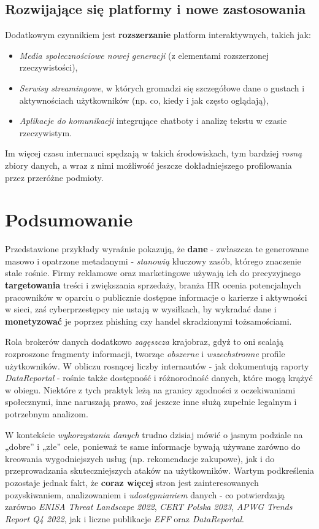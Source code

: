 \subsection{Rozwijające się platformy i nowe zastosowania}
Dodatkowym czynnikiem jest \textbf{rozszerzanie} platform interaktywnych, takich jak:
\begin{itemize}
    \item \emph{Media społecznościowe nowej generacji} (z elementami rozszerzonej rzeczywistości),
    \item \emph{Serwisy streamingowe}, w których gromadzi się szczegółowe dane o gustach i aktywnościach użytkowników (np. co, kiedy i jak często oglądają),
    \item \emph{Aplikacje do komunikacji} integrujące chatboty i analizę tekstu w czasie rzeczywistym.
\end{itemize}
Im więcej czasu internauci spędzają w takich środowiskach, tym bardziej \emph{rosną} zbiory danych, a wraz z nimi możliwość jeszcze dokładniejszego profilowania przez przeróżne podmioty.

\vspace{1em}

\section{Podsumowanie}

Przedstawione przykłady wyraźnie pokazują, że \textbf{dane} - zwłaszcza te generowane masowo i opatrzone metadanymi - \emph{stanowią} kluczowy zasób, którego znaczenie stale rośnie. Firmy reklamowe oraz marketingowe używają ich do precyzyjnego \textbf{targetowania} treści i zwiększania sprzedaży, branża HR ocenia potencjalnych pracowników w oparciu o publicznie dostępne informacje o karierze i aktywności w sieci, zaś cyberprzestępcy nie ustają w wysiłkach, by wykradać dane i \textbf{monetyzować} je poprzez phishing czy handel skradzionymi tożsamościami.

Rola brokerów danych dodatkowo \emph{zagęszcza} krajobraz, gdyż to oni scalają rozproszone fragmenty informacji, tworząc \emph{obszerne} i \emph{wszechstronne} profile użytkowników. W obliczu rosnącej liczby internautów - jak dokumentują raporty \emph{DataReportal} - rośnie także dostępność i różnorodność danych, które mogą krążyć w obiegu. Niektóre z tych praktyk leżą na granicy zgodności z oczekiwaniami społecznymi, inne naruszają prawo, zaś jeszcze inne służą zupełnie legalnym i potrzebnym analizom.

W kontekście \emph{wykorzystania danych} trudno dzisiaj mówić o jasnym podziale na „dobre” i „złe” cele, ponieważ te same informacje bywają używane zarówno do kreowania wygodniejszych usług (np. rekomendacje zakupowe), jak i do przeprowadzania skuteczniejszych ataków na użytkowników. Wartym podkreślenia pozostaje jednak fakt, że \textbf{coraz więcej} stron jest zainteresowanych pozyskiwaniem, analizowaniem i \emph{udostępnianiem} danych - co potwierdzają zarówno \emph{ENISA Threat Landscape 2022}, \emph{CERT Polska 2023}, \emph{APWG Trends Report Q4 2022}, jak i liczne publikacje \emph{EFF} oraz \emph{DataReportal}.
